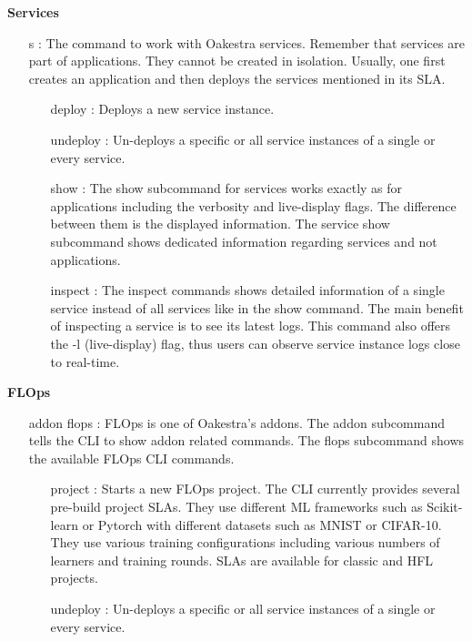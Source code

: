 \vspace{5mm}
\textbf{Services}
\begin{itemize}
    \item [s]:
        The command to work with Oakestra services.
        Remember that services are part of applications.
        They cannot be created in isolation.
        Usually, one first creates an application and then deploys the services mentioned in its SLA.
        \begin{itemize}
            \item [deploy]:
                Deploys a new service instance.
            \item [undeploy]:
                Un-deploys a specific or all service instances of a single or every service.
            \item [show]:
                The show subcommand for services works exactly as for applications including the verbosity and live-display flags.
                The difference between them is the displayed information.
                The service show subcommand shows dedicated information regarding services and not applications.
            \item [inspect]:
                The inspect commands shows detailed information of a single service instead of all services like in the show command.
                The main benefit of inspecting a service is to see its latest logs.
                This command also offers the -l (live-display) flag, thus users can observe service instance logs close to real-time.
        \end{itemize}
\end{itemize}
\vspace{5mm}
\textbf{FLOps}
\begin{itemize}
    \item [addon flops]:
        FLOps is one of Oakestra's addons.
        The addon subcommand tells the CLI to show addon related commands.
        The flops subcommand shows the available FLOps CLI commands.
        \begin{itemize}
            \item [project]:
                Starts a new FLOps project.
                The CLI currently provides several pre-build project SLAs.
                They use different ML frameworks such as Scikit-learn or Pytorch with different datasets such as MNIST or CIFAR-10.
                They use various training configurations including various numbers of learners and training rounds.
                SLAs are available for classic and HFL projects.
            \item [undeploy]:
                Un-deploys a specific or all service instances of a single or every service.
            
        \end{itemize}
\end{itemize}




